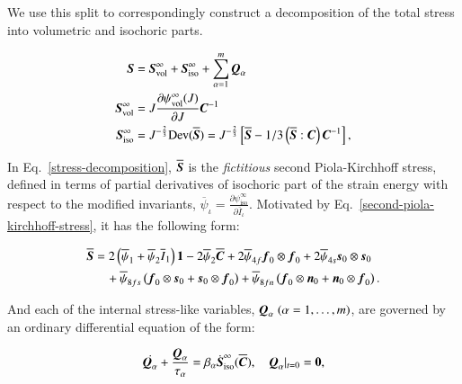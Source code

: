 \noindent We use this split to correspondingly construct a
decomposition of the total stress into volumetric and isochoric parts.

\begin{equation}
  \begin{split}
    \mbox{\boldmath$ S$} &= \mbox{\boldmath$ S$}_{\mathrm{vol}}^{\infty} + \mbox{\boldmath$ S$}_{\mathrm{iso}}^{\infty} + \sum_{\alpha = 1}^{m} \mbox{\boldmath$ Q$}_{\alpha}\\
    \mbox{\boldmath$ S$}_{\mathrm{vol}}^{\infty} &= J \frac{\partial \psi_{\mathrm{vol}}^{\infty}(J)}{\partial J} \mbox{\boldmath$ C$}^{-1}\\
    \mbox{\boldmath$ S$}_{\mathrm{iso}}^{\infty} &= J^{-\frac{2}{3}} \mathrm{Dev}(\overline{\mbox{\boldmath$ S$}}) = J^{-\frac{2}{3}}
    \left[\overline{\mbox{\boldmath$ S$}} - 1/3 \left(\overline{\mbox{\boldmath$ S$}}:\mbox{\boldmath$ C$}\right)\mbox{\boldmath$ C$}^{-1}\right],
  \end{split}
  \label{stress-decomposition}
\end{equation}

\noindent In Eq.~\ref{stress-decomposition}, $\overline{\mbox{\boldmath$ S$}}$ is the
{\em fictitious} second Piola-Kirchhoff stress, defined in terms of
partial derivatives of isochoric part of the strain energy with
respect to the modified invariants, $\overline{\psi}_{\iota} =
\frac{\partial \psi_{\mathrm{iso}}^{\infty}}{\partial
  \overline{I}_{\iota}}$. Motivated by
Eq.~\ref{second-piola-kirchhoff-stress}, it has the following form:

\begin{equation}
  \begin{split}
    \overline{\mbox{\boldmath$ S$}} &= 2 \left(\overline{\psi}_{1} + \overline{\psi}_{2} \overline{I}_{1} \right) {\bf 1}
                    - 2 \overline{\psi}_{2} \overline{\mbox{\boldmath$ C$}}
                    + 2 \overline{\psi}_{4f} \mbox{\boldmath$ f$}_{0}\otimes\mbox{\boldmath$ f$}_{0}
                    + 2 \overline{\psi}_{4s} \mbox{\boldmath$ s$}_{0}\otimes\mbox{\boldmath$ s$}_{0}\\
            &\quad  + \overline{\psi}_{8fs} \left( \mbox{\boldmath$ f$}_{0}\otimes\mbox{\boldmath$ s$}_{0} + \mbox{\boldmath$ s$}_{0}\otimes\mbox{\boldmath$ f$}_{0} \right)
                    + \overline{\psi}_{8fn} \left( \mbox{\boldmath$ f$}_{0}\otimes\mbox{\boldmath$ n$}_{0} + \mbox{\boldmath$ n$}_{0}\otimes\mbox{\boldmath$ f$}_{0} \right).
  \end{split}
\end{equation}

\noindent And each of the internal stress-like variables,
$\mbox{\boldmath$ Q$}_{\alpha}\; (\alpha = 1, \ldots, m)$, are governed by an ordinary
differential equation of the form:

\begin{equation}
  \dot{\mbox{\boldmath$ Q$}_{\alpha}} + \frac{\mbox{\boldmath$ Q$}_{\alpha}}{\tau_{\alpha}} =
  \beta_{\alpha} \dot{\mbox{\boldmath$ S$}}_{\mathrm{iso}}^{\infty}(\overline{\mbox{\boldmath$ C$}}),
  \quad \mbox{\boldmath$ Q$}_{\alpha}|_{t=0} = {\bf 0},
\end{equation}

